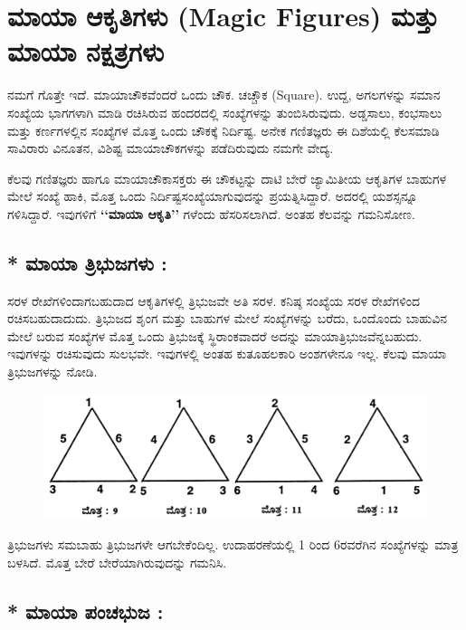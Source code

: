 
\chapter{ಮಾಯಾ ಆಕೃತಿಗಳು (Magic Figures) ಮತ್ತು ಮಾಯಾ ನಕ್ಷತ್ರಗಳು}

ನಮಗೆ ಗೊತ್ತೇ ಇದೆ. ಮಾಯಾಚೌಕವೆಂದರೆ ಒಂದು ಚೌಕ. ಚಚ್ಚೌಕ (Square). ಉದ್ದ, ಅಗಲ\-ಗಳನ್ನು ಸಮಾನ ಸಂಖ್ಯೆಯ ಭಾಗಗಳಾಗಿ ಮಾಡಿ ರಚಿಸಿರುವ ಹಂದರದಲ್ಲಿ ಸಂಖ್ಯೆ\-ಗಳನ್ನು ತುಂಬಿಸಿರುವುದು. ಅಡ್ಡಸಾಲು, ಕಂಭಸಾಲು ಮತ್ತು ಕರ್ಣಗಳಲ್ಲಿನ ಸಂಖ್ಯೆಗಳ ಮೊತ್ತ ಒಂದು ಚೌಕಕ್ಕೆ ನಿರ್ದಿಷ್ಟ. ಅನೇಕ ಗಣಿತಜ್ಞರು ಈ ದಿಶೆಯಲ್ಲಿ ಕೆಲಸಮಾಡಿ ಸಾವಿರಾರು ವಿನೂತನ, ವಿಶಿಷ್ಟ ಮಾಯಾಚೌಕಗಳನ್ನು ಪಡೆದಿರುವುದು ನಮಗೇ ವೇದ್ಯ.

ಕೆಲವು ಗಣಿತಜ್ಞರು ಹಾಗೂ ಮಾಯಾಚೌಕಾಸಕ್ತರು ಈ ಚೌಕಟ್ಟನ್ನು ದಾಟಿ ಬೇರೆ \hbox{ಜ್ಯಾಮಿತೀಯ} ಆಕೃತಿಗಳ ಬಾಹುಗಳ ಮೇಲೆ ಸಂಖ್ಯೆ ಹಾಕಿ, ಮೊತ್ತ ಒಂದು ನಿರ್ದಿಷ್ಟಸಂಖ್ಯೆ\-ಯಾಗುವುದನ್ನು ಪ್ರಯತ್ನಿಸಿದ್ದಾರೆ. ಅದರಲ್ಲಿ ಯಶಸ್ಸನ್ನೂ ಗಳಿಸಿದ್ದಾರೆ. ಇವುಗಳಿಗೆ \break \textbf{‘‘ಮಾಯಾ ಆಕೃತಿ’’} ಗಳೆಂದು ಹೆಸರಿಸಲಾಗಿದೆ. ಅಂತಹ ಕೆಲವನ್ನು ಗಮನಿಸೋಣ.

\section*{* ಮಾಯಾ ತ್ರಿಭುಜಗಳು :}

ಸರಳ ರೇಖೆಗಳಿಂದಾಗಬಹುದಾದ ಆಕೃತಿಗಳಲ್ಲಿ ತ್ರಿಭುಜವೇ ಅತಿ ಸರಳ. ಕನಿಷ್ಠ ಸಂಖ್ಯೆಯ ಸರಳ ರೇಖೆಗಳಿಂದ ರಚಿಸಬಹುದಾದುದು. ತ್ರಿಭುಜದ ಶೃಂಗ ಮತ್ತು ಬಾಹುಗಳ ಮೇಲೆ ಸಂಖ್ಯೆ\-ಗಳನ್ನು ಬರೆದು, ಒಂದೊಂದು ಬಾಹುವಿನ ಮೇಲೆ ಬರುವ ಸಂಖ್ಯೆಗಳ ಮೊತ್ತ ಒಂದು \hbox{ತ್ರಿಭುಜಕ್ಕೆ} ಸ್ಥಿರಾಂಕವಾದರೆ ಅದನ್ನು ಮಾಯಾತ್ರಿಭುಜವೆನ್ನಬಹುದು. ಇವುಗಳನ್ನು ರಚಿಸು\-ವುದು ಸುಲಭವೇ. ಇವುಗಳಲ್ಲಿ ಅಂತಹ ಕುತೂಹಲಕಾರಿ ಅಂಶಗಳೇನೂ ಇಲ್ಲ. ಕೆಲವು \hbox{ಮಾಯಾ} ತ್ರಿಭುಜಗಳನ್ನು ನೋಡಿ.
\begin{figure}[H]
\includegraphics[scale=.8]{src/figures/chap8/fig8-1.jpg}
\end{figure}

ತ್ರಿಭುಜಗಳು ಸಮಬಾಹು ತ್ರಿಭುಜಗಳೇ ಆಗಬೇಕೆಂದಿಲ್ಲ. ಉದಾಹರಣೆಯಲ್ಲಿ 1 ರಿಂದ 6ರವರೆಗಿನ ಸಂಖ್ಯೆಗಳನ್ನು ಮಾತ್ರ ಬಳಸಿದೆ. ಮೊತ್ತ ಬೇರೆ ಬೇರೆಯಾಗಿರುವುದನ್ನು ಗಮನಿಸಿ.

\section*{* ಮಾಯಾ ಪಂಚಭುಜ :}

